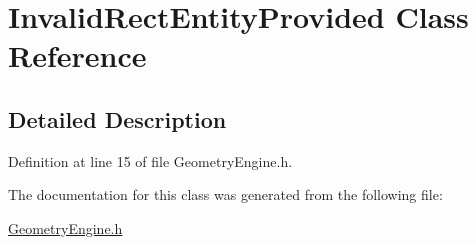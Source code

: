 \hypertarget{class_invalid_rect_entity_provided}{\section{Invalid\+Rect\+Entity\+Provided Class Reference}
\label{class_invalid_rect_entity_provided}
}


\subsection{Detailed Description}


Definition at line 15 of file Geometry\+Engine.\+h.



The documentation for this class was generated from the following file\+:\begin{DoxyCompactItemize}
\item 
\hyperlink{_geometry_engine_8h}{Geometry\+Engine.\+h}\end{DoxyCompactItemize}
